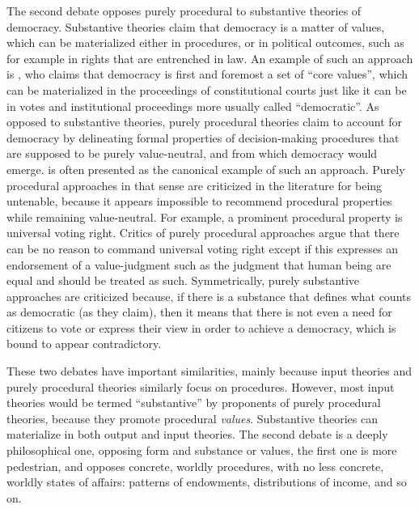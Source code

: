 \documentclass[preprint,11pt]{elsarticle}
\begin{document}
The second debate opposes purely procedural to substantive theories of democracy. Substantive theories claim that democracy is a matter of values, which can be materialized either in procedures, or in political outcomes, such as for example in rights that are entrenched in law. An example of such an approach is \cite{brettschneider_value_2006}, who claims that democracy is first and foremost a set of ``core values'', which can be materialized in the proceedings of constitutional courts just like it can be in votes and institutional proceedings more usually called ``democratic''. As opposed to substantive theories, purely procedural theories claim to account for democracy by delineating formal properties of decision-making procedures that are supposed to be purely value-neutral, and from which democracy would emerge. \cite{habermas_faktizitat_1992} is often presented as the canonical example of such an approach. Purely procedural approaches in that sense are criticized in the literature for being untenable, because it appears impossible to recommend procedural properties while remaining value-neutral. For example, a prominent procedural property is universal voting right. Critics of purely procedural approaches argue that there can be no reason to command universal voting right except if this expresses an endorsement of a value-judgment such as the judgment that human being are equal and should be treated as such. Symmetrically, purely substantive approaches are criticized because, if there is a substance that defines what counts as democratic (as they claim), then it means that there is not even a need for citizens to vote or express their view in order to achieve a democracy, which is bound to appear contradictory.


These two debates have important similarities, mainly because input theories and purely procedural theories similarly focus on procedures. However, most input theories would be termed ``substantive'' by proponents of purely procedural theories, because they promote procedural \emph{values}. Substantive theories can materialize in both output and input theories. The second debate is a deeply philosophical one, opposing form and substance or values, the first one is more pedestrian, and opposes concrete, worldly procedures, with no less concrete, worldly states of affairs: patterns of endowments, distributions of income, and so on.
\end{document}
